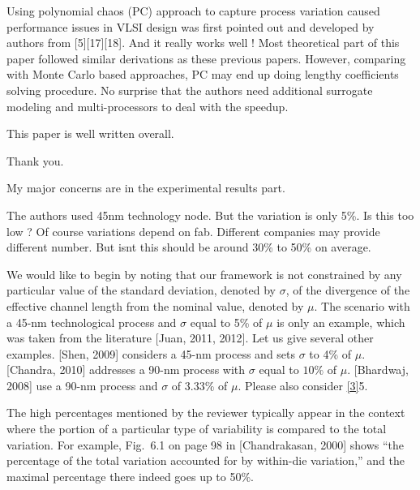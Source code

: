 \begin{reviewer}
Using polynomial chaos (PC) approach to capture process variation caused performance issues in VLSI design was first pointed out and developed by authors from [5][17][18]. And it really works well ! Most theoretical part of this paper followed similar derivations as these previous papers. However, comparing with Monte Carlo based approaches, PC may end up doing  lengthy  coefficients solving procedure. No surprise that the authors need additional surrogate modeling and multi-processors to deal with the speedup.

This paper is well written overall.
\end{reviewer}
\begin{authors}
Thank you.
\end{authors}

\begin{reviewer}
My major concerns are in the experimental results part.

The authors used 45nm technology node. But the variation is only 5\%. Is this too low ? Of course variations depend on fab. Different companies may provide different number. But isnt this should be around 30\% to 50\% on average.
\end{reviewer}
\begin{authors}
We would like to begin by noting that our framework is not constrained by any particular value of the standard deviation, denoted by $\sigma$, of the divergence of the effective channel length from the nominal value, denoted by $\mu$.
The scenario with a 45-nm technological process and $\sigma$ equal to 5\% of $\mu$ is only an example, which was taken from the literature [Juan, 2011, 2012].
Let us give several other examples.
[Shen, 2009] considers a 45-nm process and sets $\sigma$ to 4\% of $\mu$.
[Chandra, 2010] addresses a 90-nm process with $\sigma$ equal to $10\%$ of $\mu$.
[Bhardwaj, 2008] use a 90-nm process and $\sigma$ of 3.33\% of $\mu$.
Please also consider \cref{3}{5}.

The high percentages mentioned by the reviewer typically appear in the context where the portion of a particular type of variability is compared to the total variation.
For example, Fig.~6.1 on page 98 in [Chandrakasan, 2000] shows ``the percentage of the total variation accounted for by within-die variation,'' and the maximal percentage there indeed goes up to 50\%.

\begin{actions}
\end{actions}
\end{authors}

